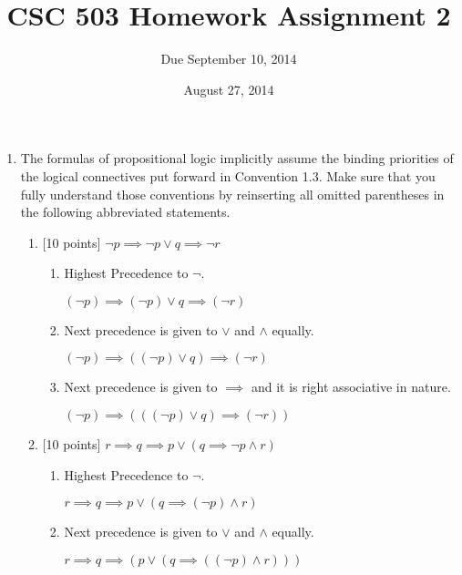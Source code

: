 \documentclass{article}
\title{CSC 503 Homework Assignment 2}
\author{Due September 10, 2014}
\date{August 27, 2014}
\begin{document}
\maketitle

\begin{enumerate}

\item The formulas of propositional logic implicitly assume
  the binding priorities of the logical connectives put forward in
  Convention 1.3.  Make sure that you fully understand those
  conventions by reinserting all omitted parentheses in the following
  abbreviated statements.

  \begin{enumerate}
  \item {[10 points]} $\mathrel{\neg} p \implies \mathrel{\neg} p \lor
    q \implies \mathrel{\neg} r$

	\begin{answer}
		\begin{enumerate}
		\item Highest Precedence to $\neg$.
		
	    	$( \neg p ) \implies ( \neg p) \lor q \implies (\neg r)$

		\item Next precedence is given to $ \lor $ and $\land $ equally.
		
			$( \neg p ) \implies (( \neg p) \lor q) \implies (\neg r)$

		\item Next precedence is given to $\implies$ and it is right associative in
		nature. 
		
			$( \neg p ) \implies ((( \neg p) \lor q) \implies (\neg r))$
		\end{enumerate}
	\end{answer}
	
  \item {[10 points]} $r \implies q \implies p \lor (q \implies
    \mathrel{\neg} p \land r)$
    
    \begin{answer}
		\begin{enumerate}
		\item Highest Precedence to $\neg$.
		
	    	$r \implies q \implies p \lor (q \implies (\neg p) \land r)$

		\item Next precedence is given to $ \lor $ and $\land $ equally.
		
			$r \implies q \implies (p \lor (q \implies ((\neg p) \land r)))$


\end{enumerate}
\end{answer}
\end{enumerate}
\end{enumerate}
\end{document}
